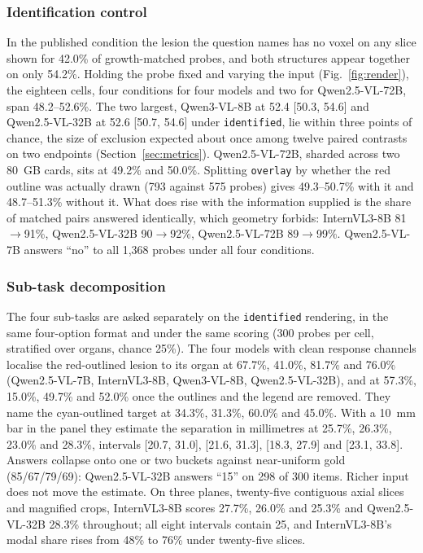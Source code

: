 \subsubsection{Identification control} In the published condition the
lesion the question names has no voxel on any slice shown for 42.0\% of
growth-matched probes, and both structures appear together on only 54.2\%.
Holding the probe fixed and varying the input (Fig.~\ref{fig:render}), the
eighteen cells, four conditions for four models and two for Qwen2.5-VL-72B,
span 48.2--52.6\%. The two largest, Qwen3-VL-8B
at 52.4 [50.3, 54.6] and Qwen2.5-VL-32B at 52.6 [50.7, 54.6] under
\texttt{identified}, lie within three points of chance, the size of
exclusion expected about once among twelve paired contrasts on two endpoints
(Section~\ref{sec:metrics}). Qwen2.5-VL-72B, sharded across two 80~GB
cards, sits at 49.2\% and 50.0\%. Splitting \texttt{overlay} by whether the red
outline was actually drawn (793 against 575 probes) gives 49.3--50.7\% with
it and 48.7--51.3\% without it. What does rise with the information supplied
is the share of matched pairs answered identically, which geometry forbids:
InternVL3-8B 81$\rightarrow$91\%, Qwen2.5-VL-32B 90$\rightarrow$92\%,
Qwen2.5-VL-72B 89$\rightarrow$99\%. Qwen2.5-VL-7B answers ``no'' to all
1{,}368 probes under all four conditions.

\subsubsection{Sub-task decomposition} The four sub-tasks are asked
separately on the \texttt{identified} rendering, in the same four-option
format and under the same scoring (300 probes per cell, stratified over
organs, chance 25\%). The four models with clean response channels localise the red-outlined
lesion to its organ at 67.7\%, 41.0\%, 81.7\% and 76.0\% (Qwen2.5-VL-7B,
InternVL3-8B, Qwen3-VL-8B, Qwen2.5-VL-32B), and at 57.3\%, 15.0\%, 49.7\% and 52.0\%
once the outlines and the legend are removed. They
name the cyan-outlined target at 34.3\%, 31.3\%, 60.0\% and 45.0\%. With a
10~mm bar in the panel they estimate the separation in millimetres at
25.7\%, 26.3\%, 23.0\% and 28.3\%, intervals
[20.7, 31.0], [21.6, 31.3], [18.3, 27.9] and [23.1, 33.8]. Answers collapse
onto one or two buckets against near-uniform gold (85/67/79/69):
Qwen2.5-VL-32B answers ``15'' on 298 of 300 items. Richer input does not
move the estimate. On three planes, twenty-five contiguous axial slices and
magnified crops, InternVL3-8B scores 27.7\%, 26.0\% and 25.3\% and
Qwen2.5-VL-32B 28.3\% throughout; all eight intervals contain 25, and
InternVL3-8B's modal share rises from 48\% to 76\% under twenty-five
slices.

